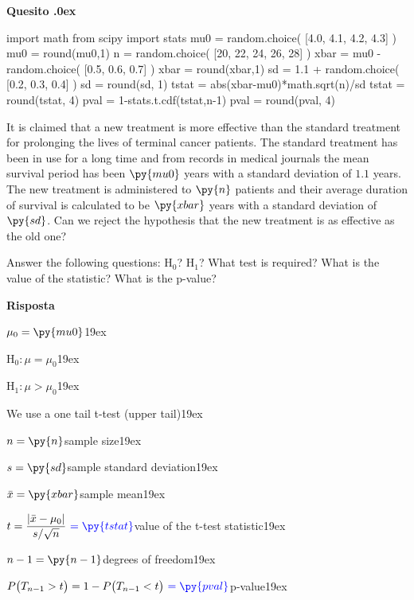 \documentclass[11pt,twoside,a4paper]{article}
\newcounter{quesito}
\newenvironment{question}{\bigskip\addtocounter{quesito}{1}\bigskip\bigskip\par\textbf{Quesito \thequesito.\kern0ex}}{\par\vspace{\parskip}}
\newenvironment{answer}{\par\textbf{Risposta\quad}}{\par\vspace{\parskip}}
\begin{document}
\begin{question}
\begin{pycode}
import math
from scipy import stats
mu0 = random.choice( [4.0, 4.1, 4.2, 4.3] )
mu0 = round(mu0,1)
n = random.choice( [20, 22, 24, 26, 28] )
xbar = mu0 - random.choice( [0.5, 0.6, 0.7] )
xbar = round(xbar,1)
sd = 1.1 + random.choice( [0.2, 0.3, 0.4] )
sd = round(sd, 1)
tstat = abs(xbar-mu0)*math.sqrt(n)/sd
tstat = round(tstat, 4)
pval = 1-stats.t.cdf(tstat,n-1)
pval = round(pval, 4)
\end{pycode}
It is claimed that a new treatment is more effective than the standard treatment for prolonging the lives of terminal cancer patients. The standard treatment has been in use for a long time and from records in medical journals the mean survival period has been $\py{mu0}$ years with a standard deviation of $1.1$ years. The new treatment is administered to $\py{n}$ patients and their average duration of survival is calculated to be $\py{xbar}$ years with a standard deviation of $\py{sd}$. Can we reject the hypothesis that the new treatment is as effective as the old one? 

Answer the following questions: H$_0$? H$_1$? What test is required? What is the value of the statistic? What is the p-value? 

\begin{answer}\parskip5pt

  $\mu_0 = \py{mu0}$\kern19ex

  H$_0:$\hfill $\mu = \mu_0$\kern19ex
  
  H$_1:$\hfill $\mu>\mu_0$\kern19ex
  
  We use a one tail t-test (upper tail)\kern19ex
  
  $n = \py{n}$\hfill sample size\kern19ex
  
  $s = \py{sd}$\hfill sample standard deviation\kern19ex
  
  $\bar{x} = \py{xbar}$\hfill sample mean\kern19ex
  
  $t = \displaystyle\frac{|\bar{x}-\mu_0|}{s/\sqrt{n}}\ {\color{blue}= \py{tstat}}$\hfill value of the t-test statistic\kern19ex
  
  $n-1 = \py{n-1}$\hfill degrees of freedom\kern19ex
  
  $P\big(T_{n-1}>t\big) = 1- P\big(T_{n-1}<t\big)\ {\color{blue} = \py{pval}}$\hfill p-value\kern19ex

\end{answer}
\end{question}
\end{document}
